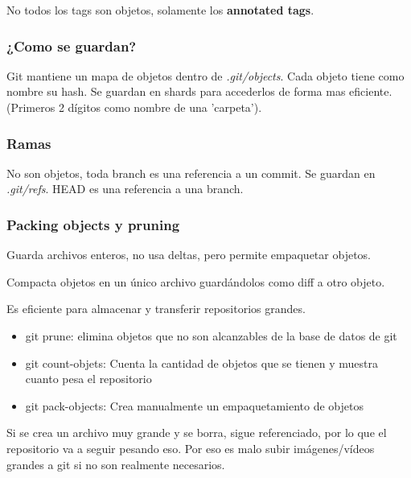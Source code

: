 \documentclass[titlepage,a4paper]{article}
\begin{document}
No todos los tags son objetos, solamente los \textbf{annotated tags}.

\subsubsection*{¿Como se guardan?}
Git mantiene un mapa de objetos dentro de \emph{.git/objects}. Cada objeto tiene como nombre su hash. Se guardan en shards para accederlos de forma mas eficiente. (Primeros 2 dígitos como nombre de una 'carpeta').

\subsubsection*{Ramas}
No son objetos, toda branch es una referencia a un commit. Se guardan en \emph{.git/refs}. HEAD es una referencia a una branch.

\subsubsection*{Packing objects y pruning}
Guarda archivos enteros, no usa deltas, pero permite empaquetar objetos.

Compacta objetos en un único archivo guardándolos como diff a otro objeto.

Es eficiente para almacenar y transferir repositorios grandes.

\begin{itemize}
    \item git prune: elimina objetos que no son alcanzables de la base de datos de git
    \item git count-objets: Cuenta la cantidad de objetos que se tienen y muestra cuanto pesa el repositorio
    \item git pack-objects: Crea manualmente un empaquetamiento de objetos
\end{itemize}

Si se crea un archivo muy grande y se borra, sigue referenciado, por lo que el repositorio va a seguir pesando eso. Por eso es malo subir imágenes/vídeos grandes a git si no son realmente necesarios.







\newpage
\end{document}
